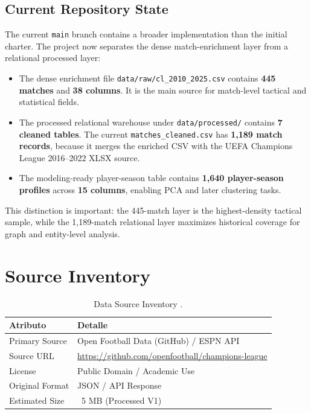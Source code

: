 \documentclass[12pt,a4paper]{article}
\begin{document}
\subsection{Current Repository State}
The current \texttt{main} branch contains a broader implementation than the initial charter. The project now separates the dense match-enrichment layer from a relational processed layer:
\begin{itemize}
    \item The dense enrichment file \texttt{data/raw/cl\_2010\_2025.csv} contains \textbf{445 matches} and \textbf{38 columns}. It is the main source for match-level tactical and statistical fields.
    \item The processed relational warehouse under \texttt{data/processed/} contains \textbf{7 cleaned tables}. The current \texttt{matches\_cleaned.csv} has \textbf{1,189 match records}, because it merges the enriched CSV with the UEFA Champions League 2016--2022 XLSX source.
    \item The modeling-ready player-season table contains \textbf{1,640 player-season profiles} across \textbf{15 columns}, enabling PCA and later clustering tasks.
\end{itemize}
This distinction is important: the 445-match layer is the highest-density tactical sample, while the 1,189-match relational layer maximizes historical coverage for graph and entity-level analysis.

\section{Source Inventory}
\begin{table}[h!]
    \centering
    \begin{tabular}{ll}
        \toprule
        \textbf{Atributo} & \textbf{Detalle} \\
        \midrule
        Primary Source& Open Football Data (GitHub) / ESPN API\\
        Source URL& \url{https://github.com/openfootball/champions-league}\\
        License& Public Domain / Academic Use\\
        Original Format& JSON / API Response\\
        Estimated Size& ~5 MB (Processed V1)\\
        \bottomrule
    \end{tabular}
    \caption{Data Source Inventory .}
\end{table}
\end{document}
